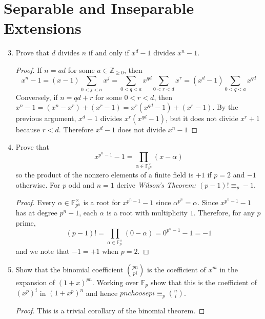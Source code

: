 \documentclass{report}
\newcommand{\Z}{\mathbb{Z}}
\newcommand{\F}{\mathbb{F}}
\begin{document}
\section{Separable and Inseparable Extensions}
\begin{enumerate} 
	\setcounter{enumi}{2}
	\item Prove that $d$ divides $n$ if and only if $x^d-1$ divides $x^n-1$.
		\begin{proof}
			If $n=ad$ for some $a\in\Z_{\geq 0}$, then 
			$$x^{n}-1=(x-1)\sum_{0<j<n}x^j=\sum_{0<q<a}x^{qd}\sum_{0<r<d}x^r=(x^d-1)\sum_{0<q<a}x^{qd}$$
			Conversely, if $n=qd+r$ for some $0<r<d$, then $x^n-1=(x^n-x^r)+(x^r-1)=x^r(x^{qd}-1)+(x^r-1)$.
			By the previous argument, $x^d-1$ divides $x^r(x^{qd}-1)$, but it does not divide $x^r+1$ because $r<d$.
			Therefore $x^d-1$ does not divide $x^n-1$
		\end{proof}
		\setcounter{enumi}{5}
	\item  Prove that 
		$$x^{p^n-1}-1=\prod_{\alpha\in\F^\times_{p^n}}(x-\alpha)$$
		so the product of the nonzero elements of a finite field is $+1$ if $p=2$ and $-1$ otherwise.
		For $p$ odd and $n=1$ derive \textit{Wilson's Theorem:} $(p-1)!\equiv_p -1$.
		\begin{proof}
			Every $\alpha\in\F^\times_{p^n}$ is a root for $x^{p^n-1}-1$ since $\alpha^{p^n}=\alpha$. Since $x^{p^n-1}-1$ has at degree $p^n-1$, each $\alpha$ is a root with multiplicity $1$.
			Therefore, for any $p$ prime,
			$$(p-1)!=\prod_{\alpha\in\F_p^\times}(0-\alpha) = 0^{p^n-1}-1=-1$$
			and we note that $-1=+1$ when $p=2$.
		\end{proof}
		\setcounter{enumi}{8}
	\item Show that the binomial coefficient ${pn \choose pi}$ is the coefficient of $x^{pi}$ in the expansion of $(1+x)^{pn}$.
		Working over $\F_p$ show that this is the coefficient of $(x^p)^i$ in $(1+x^p)^n$ and hence ${pn choose pi}\equiv_p {n \choose i}$.
		\begin{proof}
			This is a trivial corollary of the binomial theorem. 
		\end{proof}
\end{enumerate}
\end{document}

